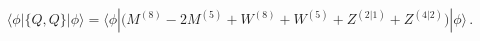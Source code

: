 \begin{equation}
\langle \phi | \{ Q, Q\} |\phi\rangle = 
\langle \phi | \Big( M^{(8)} - 2 M^{(5)} + W^{(8)} + W^{(5)} + Z^{(2|1)} +
Z^{(4|2)}\Big) | \phi\rangle\, .
\end{equation}

